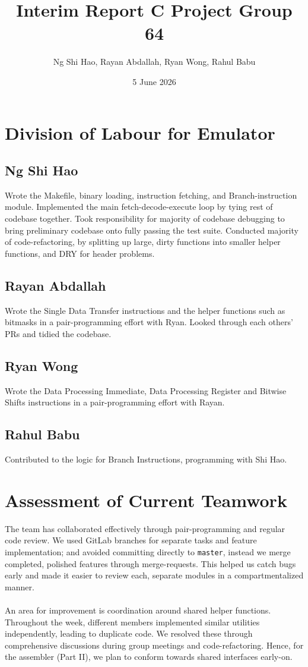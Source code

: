 \documentclass[a4paper,11pt]{article}
\title{Interim Report C Project Group 64}
\author{Ng Shi Hao, Rayan Abdallah, Ryan Wong, Rahul Babu}
\date{5 June 2026}
\begin{document}
\maketitle

\section{Division of Labour for Emulator}
\subsection{Ng Shi Hao}
Wrote the Makefile, binary loading, instruction fetching, and Branch-instruction module. Implemented the main fetch-decode-execute loop by tying rest of codebase together. Took responsibility for majority of codebase debugging to bring preliminary codebase onto fully passing the test suite. Conducted majority of code-refactoring, by splitting up large, dirty functions into smaller helper functions, and DRY for header problems. 
\subsection{Rayan Abdallah}
Wrote the Single Data Transfer instructions and the helper functions such as bitmasks in a pair-programming effort with Ryan. Looked through each others' PRs and tidied the codebase. 
\subsection{Ryan Wong}
Wrote the Data Processing Immediate, Data Processing Register and Bitwise Shifts instructions in a pair-programming effort with Rayan. 
\subsection{Rahul Babu}
Contributed to the logic for Branch Instructions, programming with Shi Hao.
\section{Assessment of Current Teamwork}
The team has collaborated effectively through pair-programming and regular code review. We used GitLab branches for separate tasks and feature implementation; and avoided committing directly to \texttt{master}, instead we merge completed, polished features through merge-requests. This helped us catch bugs early and made it easier to review each, separate  modules in a compartmentalized manner. \\ \\
An area for improvement is coordination around shared helper functions. Throughout the week, different members implemented similar utilities independently, leading to duplicate code. We resolved these through comprehensive discussions during group meetings and code-refactoring. Hence, for the assembler (Part II), we plan to conform towards shared interfaces early-on. 
\end{document}
